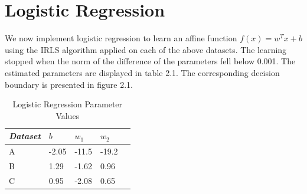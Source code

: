 \documentclass[paper=a4, fontsize=11pt]{scrartcl} %
\numberwithin{equation}{section} %
\numberwithin{figure}{section} %
\numberwithin{table}{section} %
\begin{document}
\section{Logistic Regression}
	We now implement logistic regression to learn an affine function \(f(x) = w^Tx+b\) using the IRLS algorithm applied on each of the above datasets. The learning stopped when the norm of the difference of the parameters fell below 0.001. The estimated parameters are displayed in table 2.1. The corresponding decision boundary is presented in figure 2.1.
	
	\begin{table}
		\caption {Logistic Regression Parameter Values} \label{tab:title} 
		\begin{center}		
			\begin{tabular}{*5l}   
			\toprule
				\emph{Dataset}&  $b$ & $w_1$  & $w_2$\\\midrule
				A & -2.05 & -11.5 & -19.2 \\ 
				B & 1.29 & -1.62 & 0.96 \\
				C & 0.95 & -2.08 & 0.65 \\\bottomrule
				\hline
			\end{tabular}
		\end{center}
	\end{table}
	
\end{document}

